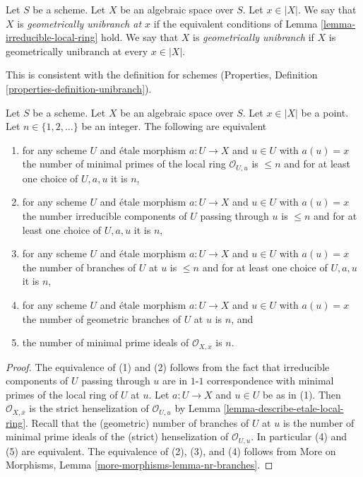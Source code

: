\begin{definition}
\label{definition-unibranch}
Let $S$ be a scheme. Let $X$ be an algebraic space over $S$.
Let $x \in |X|$. We say that $X$ is {\it geometrically unibranch
at $x$} if the equivalent conditions of
Lemma \ref{lemma-irreducible-local-ring}
hold. We say that $X$ is {\it geometrically unibranch} if $X$ is
geometrically unibranch at every $x \in |X|$.
\end{definition}

\noindent
This is consistent with the definition for schemes
(Properties, Definition \ref{properties-definition-unibranch}).

\begin{lemma}
\label{lemma-nr-branches-local-ring}
Let $S$ be a scheme. Let $X$ be an algebraic space over $S$.
Let $x \in |X|$ be a point. Let $n \in \{1, 2, \ldots\}$ be an integer.
The following are equivalent
\begin{enumerate}
\item for any scheme $U$ and \'etale morphism $a : U \to X$ and
$u \in U$ with $a(u) = x$ the number of minimal primes
of the local ring $\mathcal{O}_{U, u}$ is $\leq n$
and for at least one choice of $U, a, u$ it is $n$,
\item for any scheme $U$ and \'etale morphism $a : U \to X$ and
$u \in U$ with $a(u) = x$ the number irreducible components of
$U$ passing through $u$ is $\leq n$ and for at least one choice
of $U, a, u$ it is $n$,
\item for any scheme $U$ and \'etale morphism $a : U \to X$ and $u \in U$
with $a(u) = x$ the number of branches of $U$ at $u$ is $\leq n$
and for at least one choice of $U, a, u$ it is $n$,
\item for any scheme $U$ and \'etale morphism $a : U \to X$ and $u \in U$
with $a(u) = x$ the number of geometric branches of $U$ at $u$ is $n$, and
\item the number of minimal prime ideals of
$\mathcal{O}_{X, \overline{x}}$ is $n$.
\end{enumerate}
\end{lemma}

\begin{proof}
The equivalence of (1) and (2) follows from the fact that irreducible
components of $U$ passing through $u$ are in $1$-$1$ correspondence with
minimal primes of the local ring of $U$ at $u$. Let $a : U \to X$ and
$u \in U$ be as in (1). Then $\mathcal{O}_{X, \overline{x}}$ is the
strict henselization of $\mathcal{O}_{U, u}$ by
Lemma \ref{lemma-describe-etale-local-ring}. Recall that
the (geometric) number of branches of $U$ at $u$ is the number
of minimal prime ideals of the (strict) henselization of $\mathcal{O}_{U, u}$.
In particular (4) and (5) are equivalent.
The equivalence of (2), (3), and (4) follows from
More on Morphisms, Lemma \ref{more-morphisms-lemma-nr-branches}.
\end{proof}

